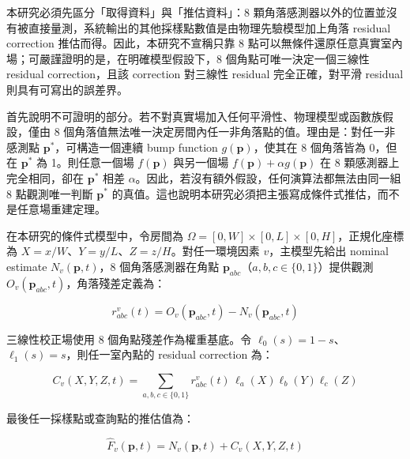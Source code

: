 \documentclass[12pt,a4paper]{article}
\begin{document}
本研究必須先區分「取得資料」與「推估資料」：8 顆角落感測器以外的位置並沒有被直接量測，系統輸出的其他採樣點數值是由物理先驗模型加上角落 residual correction 推估而得。因此，本研究不宣稱只靠 8 點可以無條件還原任意真實室內場；可嚴謹證明的是，在明確模型假設下，8 個角點可唯一決定一個三線性 residual correction，且該 correction 對三線性 residual 完全正確，對平滑 residual 則具有可寫出的誤差界。


首先說明不可證明的部分。若不對真實場加入任何平滑性、物理模型或函數族假設，僅由 8 個角落值無法唯一決定房間內任一非角落點的值。理由是：對任一非感測點 $\mathbf{p}^{*}$，可構造一個連續 bump function $g(\mathbf{p})$，使其在 8 個角落皆為 0，但在 $\mathbf{p}^{*}$ 為 1。則任意一個場 $f(\mathbf{p})$ 與另一個場 $f(\mathbf{p})+\alpha g(\mathbf{p})$ 在 8 顆感測器上完全相同，卻在 $\mathbf{p}^{*}$ 相差 $\alpha$。因此，若沒有額外假設，任何演算法都無法由同一組 8 點觀測唯一判斷 $\mathbf{p}^{*}$ 的真值。這也說明本研究必須把主張寫成條件式推估，而不是任意場重建定理。


在本研究的條件式模型中，令房間為 $\Omega=[0,W]\times[0,L]\times[0,H]$，正規化座標為 $X=x/W$、$Y=y/L$、$Z=z/H$。對任一環境因素 $v$，主模型先給出 nominal estimate $N_v(\mathbf{p},t)$，8 個角落感測器在角點 $\mathbf{p}_{abc}$（$a,b,c\in\{0,1\}$）提供觀測 $O_v(\mathbf{p}_{abc},t)$，角落殘差定義為：


\[
r_{abc}^{v}(t)=O_v(\mathbf{p}_{abc},t)-N_v(\mathbf{p}_{abc},t)
\]

三線性校正場使用 8 個角點殘差作為權重基底。令 $\ell_0(s)=1-s$、$\ell_1(s)=s$，則任一室內點的 residual correction 為：


\[
C_v(X,Y,Z,t)=\sum_{a,b,c\in\{0,1\}} r_{abc}^{v}(t)\,\ell_a(X)\ell_b(Y)\ell_c(Z)
\]

最後任一採樣點或查詢點的推估值為：


\[
\hat{F}_v(\mathbf{p},t)=N_v(\mathbf{p},t)+C_v(X,Y,Z,t)
\]
\end{document}
